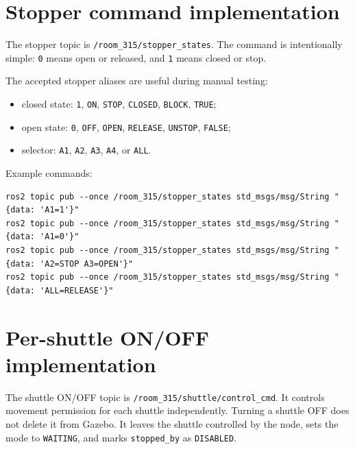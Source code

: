 \documentclass[12pt,a4paper]{report}
\newcommand{\codenext}[1]{\par\Needspace{#1\baselineskip}}
\begin{document}
\section{Stopper command implementation}

The stopper topic is
\texttt{/room\_315/stopper\_states}. The command is intentionally simple:
\texttt{0} means open or released, and \texttt{1} means closed or stop.

\codenext{22}


The accepted stopper aliases are useful during manual testing:

\begin{itemize}
\item closed state: \texttt{1}, \texttt{ON}, \texttt{STOP}, \texttt{CLOSED},
\texttt{BLOCK}, \texttt{TRUE};
\item open state: \texttt{0}, \texttt{OFF}, \texttt{OPEN}, \texttt{RELEASE},
\texttt{UNSTOP}, \texttt{FALSE};
\item selector: \texttt{A1}, \texttt{A2}, \texttt{A3}, \texttt{A4}, or
\texttt{ALL}.
\end{itemize}

Example commands:

\begin{lstlisting}[style=terminalcode]
ros2 topic pub --once /room_315/stopper_states std_msgs/msg/String "{data: 'A1=1'}"
ros2 topic pub --once /room_315/stopper_states std_msgs/msg/String "{data: 'A1=0'}"
ros2 topic pub --once /room_315/stopper_states std_msgs/msg/String "{data: 'A2=STOP A3=OPEN'}"
ros2 topic pub --once /room_315/stopper_states std_msgs/msg/String "{data: 'ALL=RELEASE'}"
\end{lstlisting}

\section{Per-shuttle ON/OFF implementation}

The shuttle ON/OFF topic is
\texttt{/room\_315/shuttle/control\_cmd}. It controls movement permission for
each shuttle independently. Turning a shuttle OFF does not delete it from
Gazebo. It leaves the shuttle controlled by the node, sets the mode to
\texttt{WAITING}, and marks \texttt{stopped\_by} as \texttt{DISABLED}.
\end{document}
